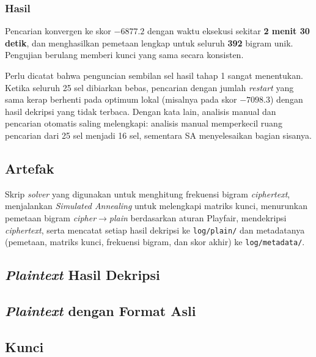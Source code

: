 \subsubsection*{Hasil}

Pencarian konvergen ke skor $-6877.2$ dengan waktu eksekusi sekitar \textbf{2 menit 30 detik}, dan
menghasilkan pemetaan lengkap untuk seluruh \textbf{392} bigram unik. Pengujian berulang memberi kunci
yang sama secara konsisten.

Perlu dicatat bahwa penguncian sembilan sel hasil tahap 1 sangat menentukan. Ketika seluruh 25 sel
dibiarkan bebas, pencarian dengan jumlah \textit{restart} yang sama kerap berhenti pada optimum lokal
(misalnya pada skor $-7098.3$) dengan hasil dekripsi yang tidak terbaca. Dengan kata lain, analisis manual
dan pencarian otomatis saling melengkapi: analisis manual memperkecil ruang pencarian dari 25 sel menjadi
16 sel, sementara SA menyelesaikan bagian sisanya.

\subsection*{Artefak}

Skrip \textit{solver} yang digunakan untuk menghitung frekuensi bigram \textit{ciphertext}, menjalankan
\textit{Simulated Annealing} untuk melengkapi matriks kunci, menurunkan pemetaan bigram
\textit{cipher}$\to$\textit{plain} berdasarkan aturan Playfair, mendekripsi \textit{ciphertext}, serta
mencatat setiap hasil dekripsi ke \texttt{log/plain/} dan metadatanya (pemetaan, matriks kunci, frekuensi
bigram, dan skor akhir) ke \texttt{log/metadata/}.



\subsection*{\textit{Plaintext} Hasil Dekripsi}


\subsection*{\textit{Plaintext} dengan Format Asli}



\subsection*{Kunci}

